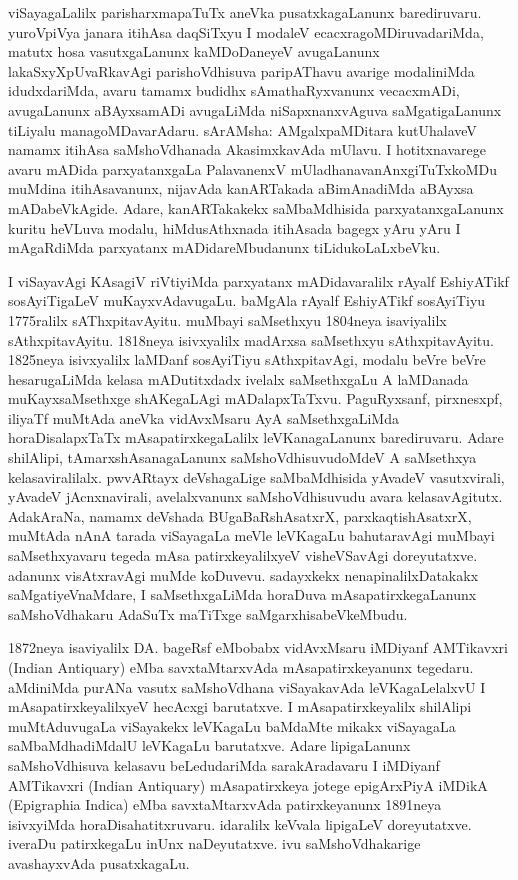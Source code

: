 \documentclass[11pt,a4size]{article}
\begin{document}
  viSayagaLalilx parisharxmapaTuTx aneVka pusatxkagaLanunx
  barediruvaru. yuroVpiVya janara itihAsa daqSiTxyu I modaleV
  ecacxragoMDiruvadariMda, matutx hosa vasutxgaLanunx kaMDoDaneyeV
  avugaLanunx lakaSxyXpUvaRkavAgi parishoVdhisuva paripAThavu avarige
  modaliniMda idudxdariMda, avaru tamamx budidhx sAmathaRyxvanunx
  vecacxmADi, avugaLanunx aBAyxsamADi avugaLiMda niSapxnanxvAguva
  saMgatigaLanunx tiLiyalu managoMDavarAdaru. sArAMsha:
  AMgalxpaMDitara kutUhalaveV namamx itihAsa saMshoVdhanada
  AkasimxkavAda mUlavu. I hotitxnavarege avaru mADida parxyatanxgaLa
  PalavanenxV mUladhanavanAnxgiTuTxkoMDu muMdina itihAsavanunx,
  nijavAda kanARTakada aBimAnadiMda aBAyxsa mADabeVkAgide. Adare,
  kanARTakakekx saMbaMdhisida parxyatanxgaLanunx kuritu heVLuva
  modalu, hiMdusAthxnada itihAsada bagegx yAru yAru I mAgaRdiMda
  parxyatanx mADidareMbudanunx tiLidukoLaLxbeVku.

I viSayavAgi KAsagiV riVtiyiMda parxyatanx mADidavaralilx rAyalf
EshiyATikf sosAyiTigaLeV muKayxvAdavugaLu. baMgAla rAyalf EshiyATikf
sosAyiTiyu 1775ralilx sAThxpitavAyitu. muMbayi saMsethxyu 1804neya
isaviyalilx sAthxpitavAyitu. 1818neya isivxyalilx madArxsa saMsethxyu
sAthxpitavAyitu. 1825neya isivxyalilx laMDanf sosAyiTiyu
sAthxpitavAgi, modalu beVre beVre hesarugaLiMda kelasa mADutitxdadx
ivelalx saMsethxgaLu A laMDanada muKayxsaMsethxge shAKegaLAgi
mADalapxTaTxvu. PaguRyxsanf, pirxnesxpf, iliyaTf muMtAda aneVka
vidAvxMsaru AyA saMsethxgaLiMda horaDisalapxTaTx mAsapatirxkegaLalilx
leVKanagaLanunx barediruvaru. Adare shilAlipi, tAmarxshAsanagaLanunx
saMshoVdhisuvudoMdeV A saMsethxya kelasaviralilalx. pwvARtayx
deVshagaLige saMbaMdhisida yAvadeV vasutxvirali, yAvadeV
jAcnxnavirali, avelalxvanunx saMshoVdhisuvudu avara
kelasavAgitutx. AdakAraNa, namamx deVshada BUgaBaRshAsatxrX,
parxkaqtishAsatxrX, muMtAda nAnA tarada viSayagaLa meVle leVKagaLu
bahutaravAgi muMbayi saMsethxyavaru tegeda mAsa patirxkeyalilxyeV
visheVSavAgi doreyutatxve. adanunx visAtxravAgi muMde
koDuvevu. sadayxkekx nenapinalilxDatakakx saMgatiyeVnaMdare, I
saMsethxgaLiMda horaDuva mAsapatirxkegaLanunx saMshoVdhakaru AdaSuTx
maTiTxge saMgarxhisabeVkeMbudu.

1872neya isaviyalilx DA. bageRsf eMbobabx vidAvxMsaru iMDiyanf
AMTikavxri {\rm (Indian Antiquary)} eMba savxtaMtarxvAda
mAsapatirxkeyanunx tegedaru. aMdiniMda purANa vasutx saMshoVdhana
viSayakavAda leVKagaLelalxvU I mAsapatirxkeyalilxyeV hecAcxgi
barutatxve. I mAsapatirxkeyalilx shilAlipi muMtAduvugaLa viSayakekx
leVKagaLu baMdaMte mikakx viSayagaLa saMbaMdhadiMdalU leVKagaLu
barutatxve. Adare lipigaLanunx saMshoVdhisuva kelasavu beLedudariMda
sarakAradavaru I iMDiyanf AMTikavxri {\rm (Indian
    Antiquary)} mAsapatirxkeya jotege epigArxPiyA iMDikA
{\rm (Epigraphia Indica)} eMba savxtaMtarxvAda
patirxkeyanunx 1891neya isivxyiMda horaDisahatitxruvaru. idaralilx
keVvala lipigaLeV doreyutatxve. iveraDu patirxkegaLu inUnx
naDeyutatxve. ivu saMshoVdhakarige avashayxvAda pusatxkagaLu.
\end{document}
